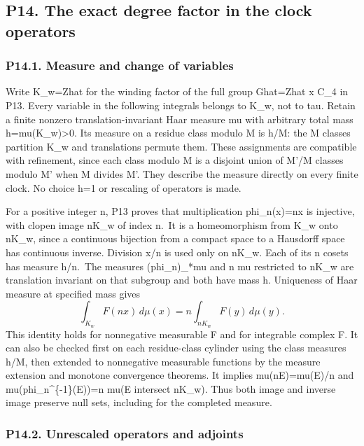 \documentclass[
  11pt,
]{article}
\begin{document}
\subsection{P14. The exact degree factor in the clock
operators}\label{p14.-the-exact-degree-factor-in-the-clock-operators}

\subsubsection{P14.1. Measure and change of
variables}\label{p14.1.-measure-and-change-of-variables}

Write K\_w=Zhat for the winding factor of the full group Ghat=Zhat x
C\_4 in P13. Every variable in the following integrals belongs to K\_w,
not to tau. Retain a finite nonzero translation-invariant Haar measure
mu with arbitrary total mass h=mu(K\_w)\textgreater0. Its measure on a
residue class modulo M is h/M: the M classes partition K\_w and
translations permute them. These assignments are compatible with
refinement, since each class modulo M is a disjoint union of M'/M
classes modulo M' when M divides M'. They describe the measure directly
on every finite clock. No choice h=1 or rescaling of operators is made.

For a positive integer n, P13 proves that multiplication phi\_n(x)=nx is
injective, with clopen image nK\_w of index n.~It is a homeomorphism
from K\_w onto nK\_w, since a continuous bijection from a compact space
to a Hausdorff space has continuous inverse. Division x/n is used only
on nK\_w. Each of its n cosets has measure h/n.~The measures
(phi\_n)\_*mu and n mu restricted to nK\_w are translation invariant on
that subgroup and both have mass h. Uniqueness of Haar measure at
specified mass gives \[
\int_{K_w}F(nx)\,d\mu(x)=n\int_{nK_w}F(y)\,d\mu(y).
\tag{P14.1}
\] This identity holds for nonnegative measurable F and for integrable
complex F. It can also be checked first on each residue-class cylinder
using the class measures h/M, then extended to nonnegative measurable
functions by the measure extension and monotone convergence theorems. It
implies mu(nE)=mu(E)/n and mu(phi\_n\^{}\{-1\}(E))=n mu(E intersect
nK\_w). Thus both image and inverse image preserve null sets, including
for the completed measure.

\subsubsection{P14.2. Unrescaled operators and
adjoints}\label{p14.2.-unrescaled-operators-and-adjoints}
\end{document}
